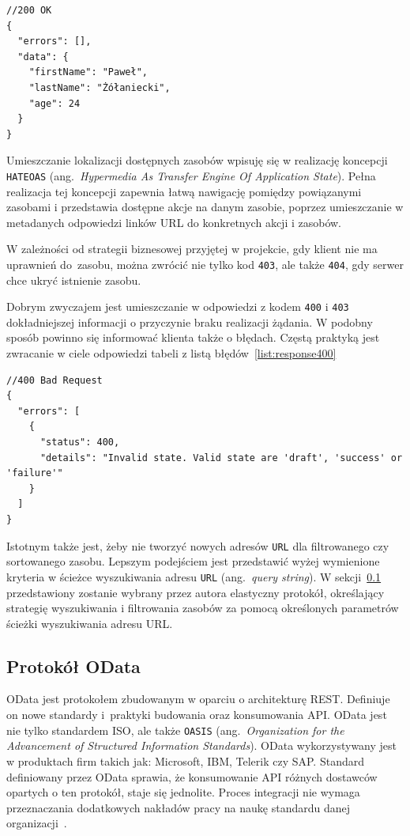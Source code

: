 {\belowcaptionskip=-10pt
\begin{lstlisting}[label=list:response200,
    caption=Przykład pomyślnej odpowiedzi serwera]
//200 OK
{
  "errors": [],
  "data": {
    "firstName": "Paweł",
    "lastName": "Żółaniecki",
    "age": 24
  }
}
\end{lstlisting}
}

Umieszczanie lokalizacji dostępnych zasobów wpisuję się w realizację koncepcji \texttt{HATEOAS} (ang.~\emph{Hypermedia As Transfer Engine Of Application State}). Pełna realizacja tej koncepcji zapewnia łatwą nawigację pomiędzy powiązanymi zasobami i przedstawia dostępne akcje na danym zasobie, poprzez umieszczanie w metadanych odpowiedzi linków URL do konkretnych akcji i zasobów.

W zależności od strategii biznesowej przyjętej w projekcie, gdy klient nie ma uprawnień do~zasobu, można zwrócić nie tylko kod \texttt{403}, ale także \texttt{404}, gdy serwer chce ukryć istnienie zasobu.

Dobrym zwyczajem jest umieszczanie w odpowiedzi z kodem \texttt{400} i \texttt{403} dokładniejszej informacji o przyczynie braku realizacji żądania. W podobny sposób powinno się informować klienta także o błędach. Częstą praktyką jest zwracanie w ciele odpowiedzi tabeli z listą błędów~\ref{list:response400}

{\belowcaptionskip=-10pt
\begin{lstlisting}[label=list:response400,
    caption=Odpowiedź serwera zawierająca opis błędu]
//400 Bad Request
{
  "errors": [
    {
      "status": 400,
      "details": "Invalid state. Valid state are 'draft', 'success' or 'failure'"
    }
  ]
}
\end{lstlisting}
}

Istotnym także jest, żeby nie tworzyć nowych adresów \texttt{URL} dla filtrowanego czy sortowanego zasobu. Lepszym podejściem jest przedstawić wyżej wymienione kryteria w ścieżce wyszukiwania adresu \texttt{URL} (ang.~\emph{query string}). W sekcji~\ref{subsec:odata} przedstawiony zostanie wybrany przez autora elastyczny protokół, określający strategię wyszukiwania i filtrowania zasobów za pomocą określonych parametrów ścieżki wyszukiwania adresu URL.

\subsection{Protokół OData}
\label{subsec:odata}

OData jest protokołem zbudowanym w oparciu o architekturę REST. Definiuje on nowe standardy i~praktyki budowania oraz konsumowania API. OData jest nie tylko standardem ISO, ale także \texttt{OASIS} (ang.~\emph{Organization for the Advancement of Structured Information Standards}). OData wykorzystywany jest w produktach firm takich jak: Microsoft, IBM, Telerik czy SAP. Standard definiowany przez OData sprawia, że konsumowanie API różnych dostawców opartych o ten protokół, staje się jednolite. Proces integracji nie wymaga przeznaczania dodatkowych nakładów pracy na naukę standardu danej organizacji~\cite{odata-why-use}.

